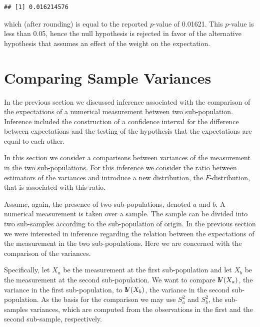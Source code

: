 \documentclass[]{krantz}
\newcommand{\Var}{{\rm I\kern-.3em V}}
\theoremstyle{definition}
\theoremstyle{definition}
\theoremstyle{definition}
\theoremstyle{remark}
\begin{document}
\begin{verbatim}
## [1] 0.016214576
\end{verbatim}

which (after rounding) is equal to the reported \(p\)-value of 0.01621.
This \(p\)-value is less than 0.05, hence the null hypothesis is
rejected in favor of the alternative hypothesis that assumes an effect
of the weight on the expectation.

\section{Comparing Sample Variances}\label{comparing-sample-variances}

In the previous section we discussed inference associated with the
comparison of the expectations of a numerical measurement between two
sub-population. Inference included the construction of a confidence
interval for the difference between expectations and the testing of the
hypothesis that the expectations are equal to each other.

In this section we consider a comparisons between variances of the
measurement in the two sub-populations. For this inference we consider
the ratio between estimators of the variances and introduce a new
distribution, the \(F\)-distribution, that is associated with this
ratio.

Assume, again, the presence of two sub-populations, denoted \(a\) and
\(b\). A numerical measurement is taken over a sample. The sample can be
divided into two sub-samples according to the sub-population of origin.
In the previous section we were interested in inference regarding the
relation between the expectations of the measurement in the two
sub-populations. Here we are concerned with the comparison of the
variances.

Specifically, let \(X_a\) be the measurement at the first sub-population
and let \(X_b\) be the measurement at the second sub-population. We want
to compare \(\Var(X_a)\), the variance in the first sub-population, to
\(\Var(X_b)\), the variance in the second sub-population. As the basis
for the comparison we may use \(S_a^2\) and \(S_b^2\), the sub-samples
variances, which are computed from the observations in the first and the
second sub-sample, respectively.
\end{document}
